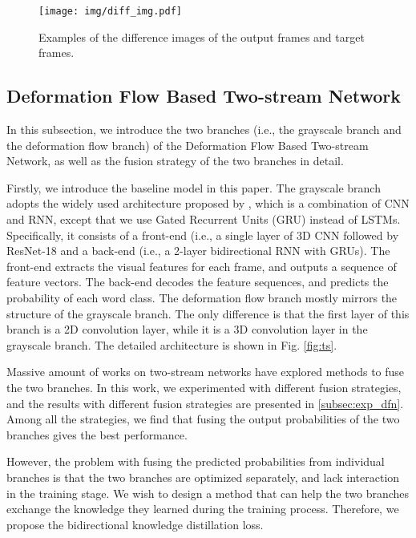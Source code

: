 \documentclass[a4paper, 10pt, conference]{ieeeconf}      \usepackage{FG2020}
\begin{document}
\begin{figure}
    \vspace{-0.2cm}
     \centering
     \texttt{[image: img/diff\_img.pdf]}
     \caption{Examples of the difference images of the output frames and target frames.}
     \label{fig:diff}
     \vspace{-0.6cm}
     \end{figure}


 \subsection{Deformation Flow Based Two-stream Network}
 \label{sec:dftn}
 
 In this subsection, we introduce the two branches (i.e., the grayscale branch and the deformation flow branch) of the Deformation Flow Based Two-stream Network, as well as the fusion strategy of the two branches in detail. 
 
 Firstly, we introduce the baseline model in this paper.
 The grayscale branch adopts the widely used architecture proposed by \cite{Stafylakis2017CombiningRN}, which is a combination of CNN and RNN, except that we use Gated Recurrent Units (GRU) \cite{chung2014empirical} instead of LSTMs. Specifically, it consists of a front-end (i.e., a single layer of 3D CNN followed by ResNet-18 \cite{he2016deep} and a back-end (i.e., a 2-layer bidirectional RNN with GRUs). The front-end extracts the visual features for each frame, and outputs a sequence of feature vectors. The back-end decodes the feature sequences, and predicts the probability of each word class. The deformation flow branch mostly mirrors the structure of the grayscale branch. The only difference is that the first layer of this branch is a 2D convolution layer, while it is a 3D convolution layer in the grayscale branch. The detailed architecture is shown in Fig. \ref{fig:ts}.
 
 Massive amount of works on two-stream networks have explored methods to fuse the two branches. In this work, we experimented with different fusion strategies, and the results with different fusion strategies are presented in \ref{subsec:exp_dfn}. 
 Among all the strategies, we find that fusing the output probabilities of the two branches gives the best performance. 

 However, the problem with fusing the predicted probabilities from individual branches is that the two branches are optimized separately, and lack interaction in the training stage. We wish to design a method that can help the two branches exchange the knowledge they learned during the training process. Therefore, we propose the bidirectional knowledge distillation loss.
 
\end{document}
